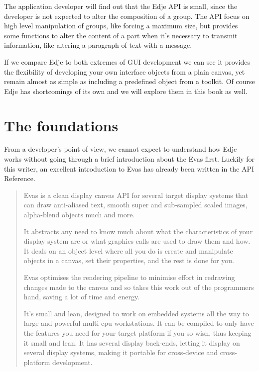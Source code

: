 \documentclass[12pt,a4paper,english]{book}
\begin{document}
The application developer will find out that the Edje API is small, since the
developer is not expected to alter the composition of a group. The API focus on
high level manipulation of groups, like forcing a maximum size, but provides
some functions to alter the content of a part when it's necessary to transmit
information, like altering a paragraph of text with a message.

If we compare Edje to both extremes of GUI development we can see it provides
the flexibility of developing your own interface objects from a plain canvas,
yet remain almost as simple as including a predefined object from a toolkit. Of
course Edje has shortcomings of its own and we will explore them in this book
as well.



\hypertarget{the-foundations}{}
\section{The foundations}

From a developer's point of view, we cannot expect to understand how Edje works
without going through a brief introduction about the Evas first. Luckily for
this writer, an excellent introduction to Evas has already been written in the
API Reference.
\begin{quote}

Evas is a clean display canvas API for several target display systems that
can draw anti-aliased text, smooth super and sub-sampled scaled images,
alpha-blend objects much and more.

It abstracts any need to know much about what the characteristics of your
display system are or what graphics calls are used to draw them and how. It
deals on an object level where all you do is create and manipulate objects
in a canvas, set their properties, and the rest is done for you.

Evas optimises the rendering pipeline to minimise effort in redrawing
changes made to the canvas and so takes this work out of the programmers
hand, saving a lot of time and energy.

It's small and lean, designed to work on embedded systems all the way to
large and powerful multi-cpu workstations. It can be compiled to only have
the features you need for your target platform if you so wish, thus keeping
it small and lean. It has several display back-ends, letting it display on
several display systems, making it portable for cross-device and
cross-platform development.
\end{quote}
\end{document}
